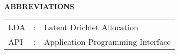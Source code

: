 \begin{center}
\large{\textbf{ABBREVIATIONS}}\\
\vspace{1cm}
\end{center}

\begin{table}[bpht!]
\centering
	\begin{tabular}{lcl}
	LDA&:& Latent Drichlet Allocation\\
	API&:&Application Programming Interface
	\end{tabular}
\end{table}